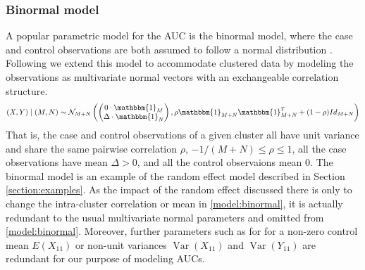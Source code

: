 \documentclass[12pt]{article}
\DeclareMathOperator{\V}{Var}
\DeclareMathOperator{\corr}{Corr}
\newcommand{\E}{E}
\newcommand{\comment}[1]{
  \iftoggle{commenttoggle}{
    {\normalsize{\color{red}{ #1}}\normalsize}
  }
  {}
}
\begin{document}
\subsubsection{Binormal model}
A popular parametric model for the AUC is the binormal model, where
the case and control observations are both assumed to follow a normal
distribution \citep{hanley1988} . Following \cite{obuchowski1997} we
extend this model to accommodate clustered data by modeling the
observations as multivariate normal vectors with an exchangeable
correlation structure.
\begin{align}
  (X,Y) \mid (M,N) \sim \mathcal{N}_{M+N}\left(
    \begin{pmatrix}0\cdot\mathbbm{1}_M\\ \Delta\cdot\mathbbm{1}_N\end{pmatrix},
  \rho\mathbbm{1}_{M+N}\mathbbm{1}_{M+N}^T + (1-\rho)Id_{M+N}
  \right)\label{model:binormal}
\end{align}
That is, the case and control observations of a given cluster all have
unit variance and share the same pairwise correlation $\rho$,
$-1/(M+N)\le\rho\le 1$, all the case observations have mean $\Delta>0$,
and all the control observaions mean $0$. The binormal model is an
example of the random effect model described in Section
\ref{section:examples}. As the impact of the random effect discussed there is only to
change the intra-cluster correlation or mean in \eqref{model:binormal}, it is actually redundant
to the usual multivariate normal parameters and omitted from \eqref{model:binormal}. %
Moreover, further parameters such as for %
for a non-zero control mean $\E(X_{11})$ or non-unit
variances $\V(X_{11})$ and $\V(Y_{11})$ are
redundant for our purpose of modeling AUCs.%
\end{document}
